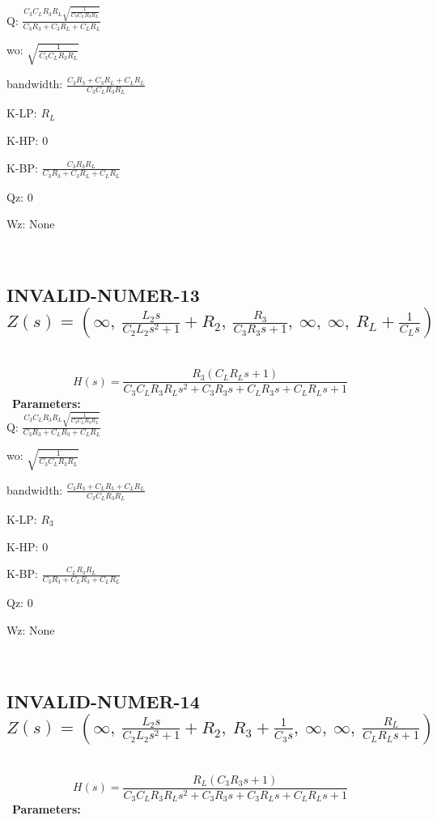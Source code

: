 \documentclass{article}
\begin{document}
Q: $\frac{C_{3} C_{L} R_{3} R_{L} \sqrt{\frac{1}{C_{3} C_{L} R_{3} R_{L}}}}{C_{3} R_{3} + C_{3} R_{L} + C_{L} R_{L}}$\ 

wo: $\sqrt{\frac{1}{C_{3} C_{L} R_{3} R_{L}}}$\ 

bandwidth: $\frac{C_{3} R_{3} + C_{3} R_{L} + C_{L} R_{L}}{C_{3} C_{L} R_{3} R_{L}}$\ 

K-LP: $R_{L}$\ 

K-HP: $0$\ 

K-BP: $\frac{C_{3} R_{3} R_{L}}{C_{3} R_{3} + C_{3} R_{L} + C_{L} R_{L}}$\ 

Qz: $0$\ 

Wz: $\text{None}$\ 

\ 

\subsection{INVALID-NUMER-13 $Z(s) = \left( \infty, \  \frac{L_{2} s}{C_{2} L_{2} s^{2} + 1} + R_{2}, \  \frac{R_{3}}{C_{3} R_{3} s + 1}, \  \infty, \  \infty, \  R_{L} + \frac{1}{C_{L} s}\right)$ } \ 
\textbf{\[H(s) = \frac{R_{3} \left(C_{L} R_{L} s + 1\right)}{C_{3} C_{L} R_{3} R_{L} s^{2} + C_{3} R_{3} s + C_{L} R_{3} s + C_{L} R_{L} s + 1}\] } \ 
\textbf{Parameters:}\\ 

Q: $\frac{C_{3} C_{L} R_{3} R_{L} \sqrt{\frac{1}{C_{3} C_{L} R_{3} R_{L}}}}{C_{3} R_{3} + C_{L} R_{3} + C_{L} R_{L}}$\ 

wo: $\sqrt{\frac{1}{C_{3} C_{L} R_{3} R_{L}}}$\ 

bandwidth: $\frac{C_{3} R_{3} + C_{L} R_{3} + C_{L} R_{L}}{C_{3} C_{L} R_{3} R_{L}}$\ 

K-LP: $R_{3}$\ 

K-HP: $0$\ 

K-BP: $\frac{C_{L} R_{3} R_{L}}{C_{3} R_{3} + C_{L} R_{3} + C_{L} R_{L}}$\ 

Qz: $0$\ 

Wz: $\text{None}$\ 

\ 

\subsection{INVALID-NUMER-14 $Z(s) = \left( \infty, \  \frac{L_{2} s}{C_{2} L_{2} s^{2} + 1} + R_{2}, \  R_{3} + \frac{1}{C_{3} s}, \  \infty, \  \infty, \  \frac{R_{L}}{C_{L} R_{L} s + 1}\right)$ } \ 
\textbf{\[H(s) = \frac{R_{L} \left(C_{3} R_{3} s + 1\right)}{C_{3} C_{L} R_{3} R_{L} s^{2} + C_{3} R_{3} s + C_{3} R_{L} s + C_{L} R_{L} s + 1}\] } \ 
\textbf{Parameters:}\\ 
\end{document}
